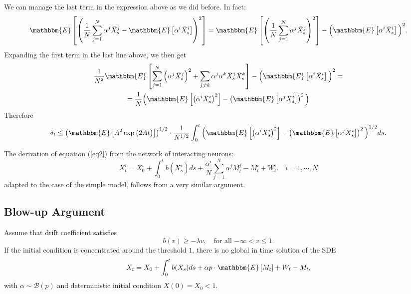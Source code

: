 We can manage the last term in the expression above as we did before. In fact: \[ \mathbbm{E} \left[ \left( \frac{1}{N} \sum_{j = 1}^N \alpha^j \bar{X}^j_s - \mathbbm{E} \left[ \alpha^i \bar{X}^i_s \right] \right)^2 \right] = \mathbbm{E} \left[ \left( \frac{1}{N} \sum_{j=1}^N \alpha^j \bar{X}^j_s \right)^2 \right] - \Big( \mathbbm{E} \left[ \alpha^i \bar{X}^i_s \right] \Big)^2. \]
Expanding the first term in the last line above, we then get \begin{multline*} \frac{1}{N^2} \mathbbm{E}\left[ \sum_{j = 1}^N \Big( \alpha^j \bar{X}^j_s \Big)^2 + \sum_{j \neq k} \alpha^j \alpha^k \bar{X}^j_s \bar{X}^k_s \right] - \Big( \mathbbm{E} \left[ \alpha^i \bar{X}^i_s \right] \Big)^2 = \\ = \frac{1}{N} \Big( \mathbbm{E} \left[ \left( \alpha^i \bar{X}^i_s \right)^2 \right] - \left( \mathbbm{E} \left[ \alpha^j \bar{X}^i_s \right] \right)^2 \Big) \end{multline*}
Therefore \[ \delta_t \leq \left( \mathbbm{E} \left[ A^2 \exp \big( 2 A t \big) \right] \right)^{1/2} \cdot \frac{1}{N^{1/2}} \int_0^t \Big( \mathbbm{E} \left[ \left( \alpha^i \bar{X}^i_s \right)^2 \right] - \left( \mathbbm{E} \left[ \alpha^j \bar{X}^i_s \right] \right)^2 \Big)^{1/2} ds. \]

The derivation of equation  (\ref{eq2}) from the network of interacting neurons:
\begin{equation}
 X^i_t = X^i_0 + \int_0^t b(X^i_s) ds + \frac{\alpha^i}{N} \sum_{j = 1}^N \alpha^{j} M^j_t - M^i_t + W^i_t. \quad  i=1,\cdots,N\label{eq:aiaj}
 \end{equation}
adapted to the case of the simple model, follows from a very similar argument.
\subsection{Blow-up Argument}
\begin{theorem}
Assume that drift coefficient satisfies
\[b(v) \geq -\lambda v, \quad \text{for all $-\infty<v\leq1$.}\]
If the initial condition is concentrated around the threshold $1$, there is no global in time solution of the SDE
\begin{equation} \label{limit1} X_t = X_0 + \int_0^t b(X_s) ds + \alpha p \cdot \mathbbm{E} \left[ M_t \right] + W_t - M_t, \end{equation}
with $\alpha\sim\mathcal{B}(p)$ and deterministic initial condition $X(0) = X_0 < 1$.
\end{theorem}

